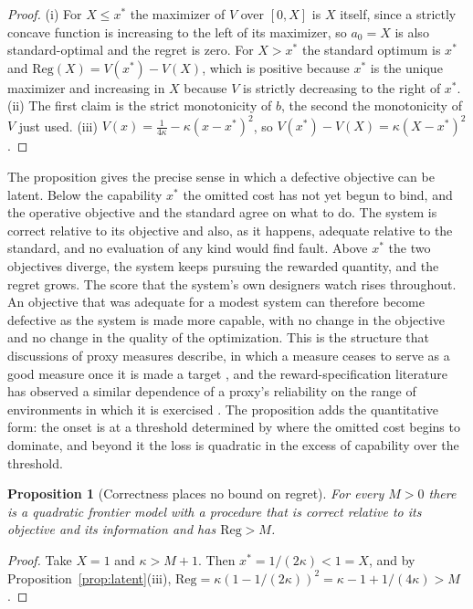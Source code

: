 \documentclass[11pt]{article}
\newcommand{\Reg}{\mathrm{Reg}}
\theoremstyle{plain}
\newtheorem{proposition}{Proposition}
\theoremstyle{definition}
\begin{document}
\begin{proof}
(i) For $X\le x^*$ the maximizer of $V$ over $[0,X]$ is $X$ itself, since a strictly concave function is increasing to the left of its maximizer, so $a_0=X$ is also standard-optimal and the regret is zero. For $X>x^*$ the standard optimum is $x^*$ and $\Reg(X)=V(x^*)-V(X)$, which is positive because $x^*$ is the unique maximizer and increasing in $X$ because $V$ is strictly decreasing to the right of $x^*$. (ii) The first claim is the strict monotonicity of $b$, the second the monotonicity of $V$ just used. (iii) $V(x)=\frac1{4\kappa}-\kappa(x-x^*)^2$, so $V(x^*)-V(X)=\kappa(X-x^*)^2$.
\end{proof}

The proposition gives the precise sense in which a defective objective can be latent. Below the capability $x^*$ the omitted cost has not yet begun to bind, and the operative objective and the standard agree on what to do. The system is correct relative to its objective and also, as it happens, adequate relative to the standard, and no evaluation of any kind would find fault. Above $x^*$ the two objectives diverge, the system keeps pursuing the rewarded quantity, and the regret grows. The score that the system's own designers watch rises throughout. An objective that was adequate for a modest system can therefore become defective as the system is made more capable, with no change in the objective and no change in the quality of the optimization. This is the structure that discussions of proxy measures describe, in which a measure ceases to serve as a good measure once it is made a target \cite{goodhart1975problems,strathern1997improving,manheim2018categorizing}, and the reward-specification literature has observed a similar dependence of a proxy's reliability on the range of environments in which it is exercised \cite{hadfieldmenell2017inverse}. The proposition adds the quantitative form: the onset is at a threshold determined by where the omitted cost begins to dominate, and beyond it the loss is quadratic in the excess of capability over the threshold.

\begin{proposition}[Correctness places no bound on regret]\label{prop:unbounded}
For every $M>0$ there is a quadratic frontier model with a procedure that is correct relative to its objective and its information and has $\Reg>M$.
\end{proposition}

\begin{proof}
Take $X=1$ and $\kappa>M+1$. Then $x^*=1/(2\kappa)<1=X$, and by Proposition~\ref{prop:latent}(iii), $\Reg=\kappa(1-1/(2\kappa))^2=\kappa-1+1/(4\kappa)>M$.
\end{proof}
\end{document}
